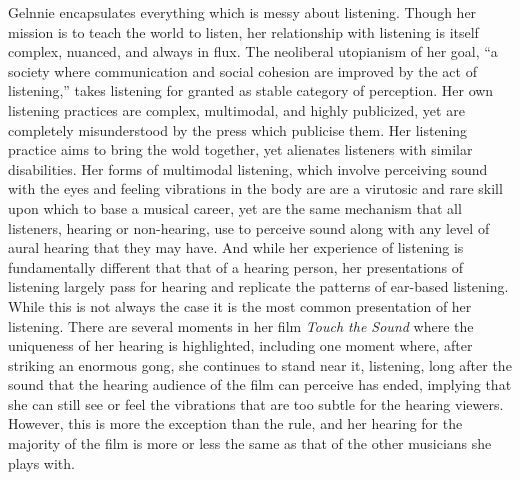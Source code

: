 \documentclass[12pt,letterpaper]{article}
\begin{document}
	Gelnnie encapsulates everything which is messy about listening. Though 
	her mission is to teach the world to listen, her relationship with 
	listening is itself complex, nuanced, and always in flux. The 
	neoliberal utopianism of her goal, ``a society where communication and 
	social cohesion are improved by the act of 
	listening,''\autocite{GlennieOnline} takes listening
	for granted as stable category of perception. Her own listening 
	practices are complex, multimodal, and highly publicized, yet are 
	completely
	misunderstood by the press which publicise them. Her listening practice
	aims to bring the wold together, yet alienates listeners with similar 
	disabilities. Her forms of multimodal listening, which involve 
	perceiving sound with the eyes and feeling vibrations in the body are 
	are a virutosic and rare skill upon which to base a musical career, yet
	are the same mechanism that all listeners, hearing or 
	non-hearing, use to perceive sound along with any level of aural 
	hearing that they may have. And while her experience of listening is
	fundamentally different that that of a hearing person, her 
	presentations of listening largely pass for hearing and replicate the
	patterns of ear-based listening. While this is not always the case it
	is the most common presentation of her listening. There are several
	moments in her film \textit{Touch the Sound} where the uniqueness of 
	her hearing is highlighted, including one moment where, after striking
	an enormous gong, she continues to stand near it, listening, long after
	the sound that the hearing audience of the film can perceive has ended,
	implying that she can still see or feel the vibrations that are too 
	subtle for the hearing viewers. However, this is more the exception
	than the rule, and her hearing for the majority of the film is more or
	less the same as that of the other musicians she plays with.  
\end{document}

